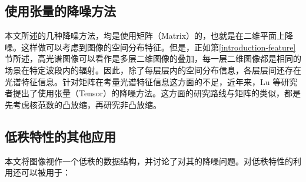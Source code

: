 \documentclass[12pt, a4paper]{article}
\begin{document}
\subsection{使用张量的降噪方法}
\par 本文所述的几种降噪方法，均是使用矩阵（Matrix）的，也就是在二维平面上降噪。这样做可以考虑到图像的空间分布特征。但是，正如第\ref{introduction-feature}节所述，高光谱图像可以看作是多层二维图像的叠加，每一层二维图像都是相同的场景在特定波段内的辐射。因此，除了每层层内的空间分布信息，各层层间还存在光谱特征信息。针对矩阵在考量光谱特征信息这方面的不足，近年来，Lu 等研究者提出了使用张量（Tensor）的降噪方法\cite{Tensor-1}\cite{Tensor-2}\cite{Tensor-3}。这方面的研究路线与矩阵的类似，都是先考虑核范数的凸放缩\cite{Tensor-1}，再研究非凸放缩\cite{Tensor-2}\cite{Tensor-3}。
\subsection{低秩特性的其他应用}
\par 本文将图像视作一个低秩的数据结构，并讨论了对其的降噪问题。对低秩特性的利用还可以被用于\cite{Review}：
\end{document}

